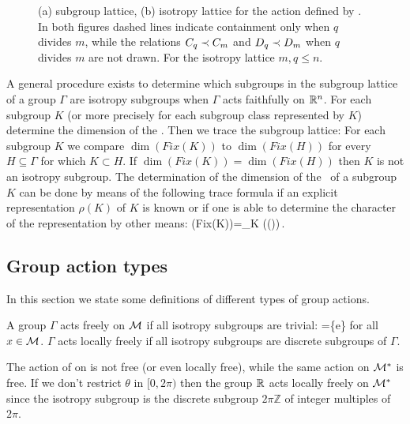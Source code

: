 \begin{example}
\begin{figure}
\begin{center}
\end{center}
\caption[O(2) lattices]{
    {\small
    (a)  subgroup lattice, (b)  isotropy lattice for the action
	defined by . In both figures dashed lines indicate
	containment only when $q$ divides $m$, while the relations $C_{q}\prec C_{m}$
	and $D_{q}\prec D_{m}$ when $q$ divides $m$ are not drawn. For the isotropy lattice $m,q\le n$.
	}}
\label{fig:O2lattice}
    \vspace*{-5pt}
\end{figure}

\end{example}

A general procedure exists \cite{gatermannHab} to determine which subgroups in the subgroup lattice of a group $\Gamma$ are isotropy
subgroups when $\Gamma$ acts faithfully on $\mathbb{R}^{n}$.
For each subgroup $K$ (or more precisely for each subgroup class represented by $K$)
determine the dimension of the \fixedsp. Then we trace the subgroup lattice: For each subgroup
$K$ we compare $\dim(Fix(K))$ to $\dim(Fix(H))$ for every $H\subseteq\Gamma$ for which $K\subset H$.
If  $\dim(Fix(K))=\dim(Fix(H))$ then $K$ is not an isotropy subgroup. The determination of the dimension of the
\fixedsp\ of a subgroup $K$ can be done by means of the following trace formula if an explicit representation
$\rho(K)$ of $K$ is known or if one is able to determine the character of the representation by other means:
\beq
	\dim(Fix(K))=\sum_{\kappa\in K} \trace(\rho(\kappa))\,.
\eeq


\subsection{Group action types}

In this section we state some definitions of different types of group actions.

\begin{definition}
\label{def:free}
A group $\Gamma$ acts freely on $\mathcal{M}$ if all isotropy subgroups are trivial: =\{e\} for all $x\in \mathcal{M}$.
$\Gamma$ acts locally freely if all isotropy subgroups are discrete subgroups of $\Gamma$.
\end{definition}

\begin{example}
The action  of  on  is not free (or even locally free), while the same action on $\mathcal{M}^*$ is free. If we don't
restrict $\theta$ in $[0,2\pi)$ then the group $\mathbb{R}^{}$ acts locally freely on $\mathcal{M}^*$
since the isotropy subgroup is the discrete subgroup $2\pi\mathbb{Z}$ of integer multiples of $2\pi$.
\end{example}

